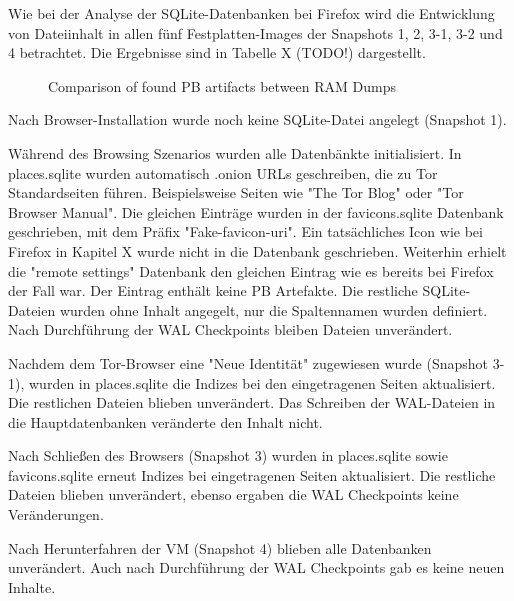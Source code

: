 Wie bei der Analyse der SQLite-Datenbanken bei Firefox wird die Entwicklung von Dateiinhalt in allen fünf Festplatten-Images der Snapshots 1, 2, 3-1, 3-2 und 4 betrachtet. Die Ergebnisse sind in Tabelle X (TODO!) dargestellt.
\begin{figure}[h!]
	\centerline{}
	\label{chart:final-criteria}  
	\caption{Comparison of found PB artifacts between RAM Dumps}
\end{figure}
Nach Browser-Installation wurde noch keine SQLite-Datei angelegt (Snapshot 1).

Während des Browsing Szenarios wurden alle Datenbänkte initialisiert.
In places.sqlite wurden automatisch .onion URLs geschreiben, die zu Tor Standardseiten führen. Beispielsweise Seiten wie "The Tor Blog" oder "Tor Browser Manual".
Die gleichen Einträge wurden in der favicons.sqlite Datenbank geschrieben, mit dem Präfix "Fake-favicon-uri". Ein tatsächliches Icon wie bei Firefox in Kapitel X wurde nicht in die Datenbank geschrieben. 
Weiterhin erhielt die "remote settings" Datenbank den gleichen Eintrag wie es bereits bei Firefox der Fall war. Der Eintrag enthält keine PB Artefakte.
Die restliche SQLite-Dateien wurden ohne Inhalt angegelt, nur die Spaltennamen wurden definiert.
Nach Durchführung der WAL Checkpoints bleiben Dateien unverändert.

Nachdem dem Tor-Browser eine "Neue Identität" zugewiesen wurde (Snapshot 3-1), wurden in places.sqlite die Indizes bei den eingetragenen Seiten aktualisiert. Die restlichen Dateien blieben unverändert. Das Schreiben der WAL-Dateien in die Hauptdatenbanken veränderte den Inhalt nicht.

Nach Schließen des Browsers (Snapshot 3) wurden in places.sqlite sowie favicons.sqlite erneut Indizes bei eingetragenen Seiten aktualisiert. Die restliche Dateien blieben unverändert, ebenso ergaben die WAL Checkpoints keine Veränderungen.

Nach Herunterfahren der VM (Snapshot 4) blieben alle Datenbanken unverändert. Auch nach Durchführung der WAL Checkpoints gab es keine neuen Inhalte.

